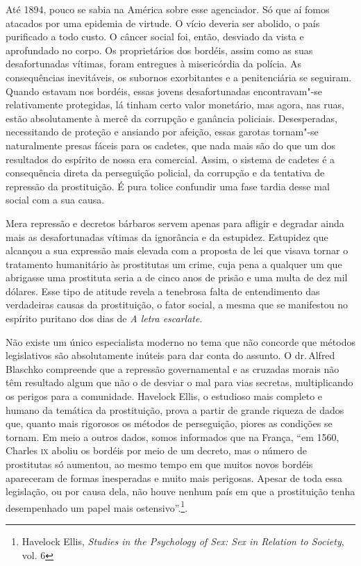 Até 1894, pouco se sabia na América sobre esse agenciador. Só que aí
fomos atacados por uma epidemia de virtude. O vício deveria ser abolido,
o país purificado a todo custo. O câncer social foi, então, desviado da
vista e aprofundado no corpo. Os proprietários dos bordéis, assim como
as suas desafortunadas vítimas, foram entregues à misericórdia da
polícia. As consequências inevitáveis, os subornos exorbitantes e a
penitenciária se seguiram. Quando estavam nos bordéis, essas jovens
desafortunadas encontravam"-se relativamente protegidas, lá tinham certo
valor monetário, mas agora, nas ruas, estão absolutamente à mercê da
corrupção e ganância policiais. Desesperadas, necessitando de proteção e
ansiando por afeição, essas garotas tornam"-se naturalmente presas fáceis
para os cadetes, que nada mais são do que um dos resultados do espírito de nossa
era comercial. Assim, o sistema de cadetes é a consequência direta da
perseguição policial, da corrupção e da tentativa de repressão da
prostituição. É pura tolice confundir uma fase tardia desse mal social
com a sua causa.

Mera repressão e decretos bárbaros servem apenas para afligir e
degradar ainda mais as desafortunadas vítimas da ignorância e da
estupidez. Estupidez que alcançou a sua expressão mais elevada com a
proposta de lei que visava tornar o tratamento humanitário às prostitutas um
crime, cuja pena a qualquer um que abrigasse uma prostituta seria a de cinco anos de
prisão e uma multa de dez mil dólares. Esse tipo de atitude revela a tenebrosa
falta de entendimento das verdadeiras causas da prostituição,
o fator social, a mesma que se manifestou no espírito puritano
dos dias de \emph{A letra escarlate}.

Não existe um único especialista moderno no tema que não concorde
que métodos legislativos são absolutamente inúteis para dar conta do
assunto. O dr.\,Alfred Blaschko compreende que a repressão governamental
e as cruzadas morais não têm resultado algum que não o de desviar o mal
para vias secretas, multiplicando os perigos para a comunidade. Havelock
Ellis, o estudioso mais completo e humano da temática da prostituição, prova a
partir de grande riqueza de dados que, quanto mais rigorosos os métodos
de perseguição, piores as condições se tornam. Em meio a outros dados,
somos informados que na França, ``em 1560, Charles \textsc{ix} aboliu os bordéis
por meio de um decreto, mas o número de prostitutas só aumentou, ao
mesmo tempo em que muitos novos bordéis apareceram de formas inesperadas
e muito mais perigosas. Apesar de toda essa legislação, ou por causa
dela, não houve nenhum país em que a prostituição tenha desempenhado um
papel mais ostensivo''.\footnote{Havelock Ellis, \emph{Studies in the
  Psychology of Sex: Sex in Relation to Society}, vol. 6}.

